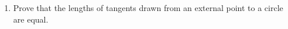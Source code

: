 \begin{enumerate}
	\item Prove that the lengths of tangents drawn from an external point to a circle are equal.
\end{enumerate}
